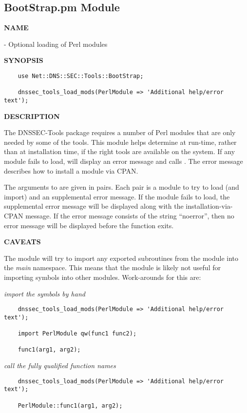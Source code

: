\clearpage

\subsection{\bf BootStrap.pm Module}

{\bf NAME}

 - Optional loading of Perl modules

{\bf SYNOPSIS}

\begin{verbatim}
    use Net::DNS::SEC::Tools::BootStrap;

    dnssec_tools_load_mods(PerlModule => 'Additional help/error text');
\end{verbatim}


{\bf DESCRIPTION}

The DNSSEC-Tools package requires a number of Perl modules that are only
needed by some of the tools.  This module helps determine at run-time, rather
than at installation time, if the right tools are available on the system.
If any module fails to load,  will display an
error message and calls .  The error message describes how to
install a module via CPAN.

The arguments to  are given in pairs.  Each
pair is a module to try to load (and import) and an supplemental error
message.  If the module fails to load, the supplemental error message will be
displayed along with the installation-via-CPAN message.  If the error message
consists of the string ``noerror'', then no error message will be displayed
before the function exits.

{\bf CAVEATS}

The module will try to import any exported subroutines from the module into
the {\it main} namespace.  This means that the  module
is likely not useful for importing symbols into other modules.  Work-arounds
for this are:

\begin{description}

\item {\it import the symbols by hand}\verb" "

\begin{verbatim}
    dnssec_tools_load_mods(PerlModule => 'Additional help/error text');

    import PerlModule qw(func1 func2);

    func1(arg1, arg2);
\end{verbatim}

\item {\it call the fully qualified function names}\verb" "

\begin{verbatim}
    dnssec_tools_load_mods(PerlModule => 'Additional help/error text');

    PerlModule::func1(arg1, arg2);
\end{verbatim}

\end{description}
